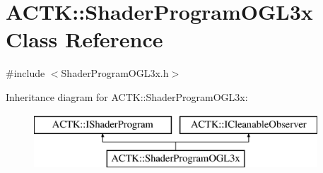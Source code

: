 \hypertarget{class_a_c_t_k_1_1_shader_program_o_g_l3x}{\section{A\-C\-T\-K\-:\-:Shader\-Program\-O\-G\-L3x Class Reference}
\label{class_a_c_t_k_1_1_shader_program_o_g_l3x}
}


{\ttfamily \#include $<$Shader\-Program\-O\-G\-L3x.\-h$>$}

Inheritance diagram for A\-C\-T\-K\-:\-:Shader\-Program\-O\-G\-L3x\-:\begin{figure}[H]
\begin{center}
\leavevmode
\includegraphics[height=2.000000cm]{class_a_c_t_k_1_1_shader_program_o_g_l3x}
\end{center}
\end{figure}
